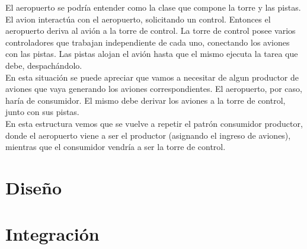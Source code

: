 \documentclass[a4paper,12pt,titlepage]{article}
\begin{document}
El aeropuerto se podría entender como la clase que compone la torre y las pistas. El avion interactúa con el
aeropuerto, solicitando un control. Entonces el aeropuerto deriva al avión a la torre de control.
La torre de control posee varios controladores que trabajan independiente de cada uno, conectando los aviones
con las pistas. Las pistas alojan el avión hasta que el mismo ejecuta la tarea que debe, despachándolo.\\

En esta situación se puede apreciar que vamos a necesitar de algun productor de aviones
que vaya generando los aviones correspondientes. El aeropuerto, por caso, haría de consumidor.
El mismo debe derivar los aviones a la torre de control, junto con sus pistas.\\
En esta estructura vemos que se vuelve a repetir el patrón consumidor productor, donde el aeropuerto
viene a ser el productor (asignando el ingreso de aviones), mientras que el consumidor vendría a ser la torre de control.\\


\newpage
\section{Diseño}

\newpage
\section{Integración}
\end{document}
